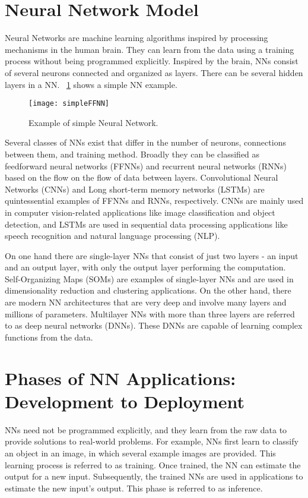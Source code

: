 \section{Neural Network Model}
Neural Networks are machine learning algorithms inspired by processing mechanisms in the human brain. They can learn from the data using a training process without being programmed explicitly. Inspired by the brain, NNs consist of several neurons connected and organized as layers. There can be several hidden layers in a NN. \figurename{~\ref{fig:simpleNN}} shows a simple NN example. 
\begin{figure}[!htb]
	\centering
	\captionsetup{font=sf}
	\texttt{[image: simpleFFNN]}
	\caption{Example of simple Neural Network.}
	\label{fig:simpleNN}
\end{figure}

Several classes of NNs exist that differ in the number of neurons, connections between them, and training method. Broadly they can be classified as feedforward neural networks (FFNNs) and recurrent neural networks (RNNs) based on the flow on the flow of data between layers. Convolutional Neural Networks (CNNs) and Long short-term memory networks (LSTMs) are quintessential examples of FFNNs and RNNs, respectively. CNNs are mainly used in computer vision-related applications like image classification and object detection, and LSTMs are used in sequential data processing applications like speech recognition and natural language processing (NLP). 

On one hand there are single-layer NNs that consist of just two layers - an input and an
output layer, with only the output layer performing the computation. Self-Organizing
Maps (SOMs) are examples of single-layer NNs and are used in dimensionality reduction
and clustering applications. On the other hand, there are modern NN architectures that
are very deep and involve many layers and millions of parameters. Multilayer NNs with
more than three layers are referred to as deep neural networks (DNNs). These DNNs
are capable of learning complex functions from the data.

\section{Phases of NN Applications: Development to Deployment}
NNs need not be programmed explicitly, and they learn from the raw data to provide solutions to real-world problems. For example, NNs first learn to classify an object in an image, in which several example images are provided. This learning process is referred to as training. Once trained, the NN can estimate the output for a new input. Subsequently, the trained NNs are used in applications to estimate the new input's output. This phase is referred to as inference.

